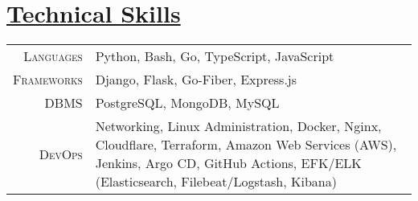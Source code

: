 \documentclass[a4paper,10pt]{extarticle} %
\begin{document}
 \vspace{+0.4cm} \section{\textcolor{primary}{\href{https://www.github.com/proffapt/bodhitree}{Technical Skills}}}

 \vspace{+0.2cm}

 \begin{tabular}{r|p{15cm}}
 \textsc{Languages} & Python, Bash, Go, TypeScript, JavaScript \\
 \textsc{Frameworks} & Django, Flask, Go-Fiber, Express.js  \\
 \textsc{DBMS} & PostgreSQL, MongoDB, MySQL \\
 \textsc{DevOps} & Networking, Linux Administration, Docker, Nginx, Cloudflare, Terraform, Amazon Web Services (AWS), Jenkins, Argo CD, GitHub Actions, EFK/ELK (Elasticsearch, Filebeat/Logstash, Kibana)  \\
 
\end{tabular}
\end{document}
